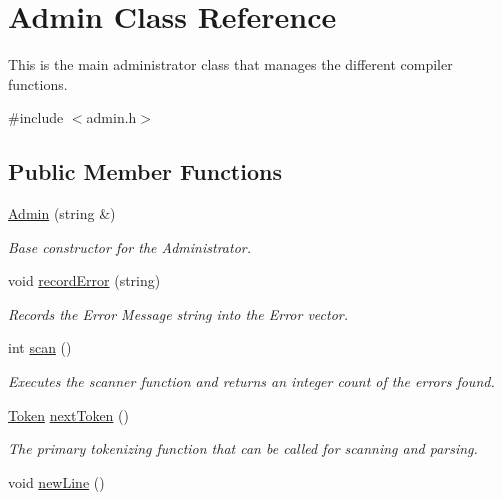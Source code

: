 \hypertarget{classAdmin}{
\section{Admin Class Reference}
\label{classAdmin}
}


This is the main administrator class that manages the different compiler functions.  




{\ttfamily \#include $<$admin.h$>$}

\subsection*{Public Member Functions}
\begin{DoxyCompactItemize}
\item 
\hyperlink{classAdmin_a5b1a3a537008af6065e9cb55522b7a67}{Admin} (string \&)
\begin{DoxyCompactList}\small\item\em Base constructor for the Administrator. \item\end{DoxyCompactList}\item 
void \hyperlink{classAdmin_a6519bde7fd1ffd997a66987c2417d7bd}{recordError} (string)
\begin{DoxyCompactList}\small\item\em Records the Error Message string into the Error vector. \item\end{DoxyCompactList}\item 
int \hyperlink{classAdmin_aaa4f711e8151dceab8d90c5f127c6820}{scan} ()
\begin{DoxyCompactList}\small\item\em Executes the scanner function and returns an integer count of the errors found. \item\end{DoxyCompactList}\item 
\hyperlink{classToken}{Token} \hyperlink{classAdmin_a7d32bf0c9bcc29be8f622e9b07cfb3d8}{nextToken} ()
\begin{DoxyCompactList}\small\item\em The primary tokenizing function that can be called for scanning and parsing. \item\end{DoxyCompactList}\item 
void \hyperlink{classAdmin_ae121a9ce2a34ac4075d074c2d1f306c5}{newLine} ()

\end{DoxyCompactItemize}
